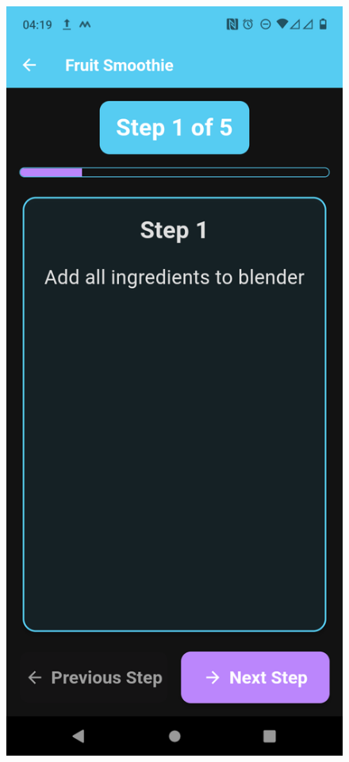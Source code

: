 \documentclass[]{project_final}
\begin{document}
\begin{figure}[ht!]
  \centering
  \begin{minipage}[t]{0.4\textwidth}
    \includegraphics[height=0.5\textheight]{STEP1.png}

\end{minipage}
\end{figure}
\end{document}
